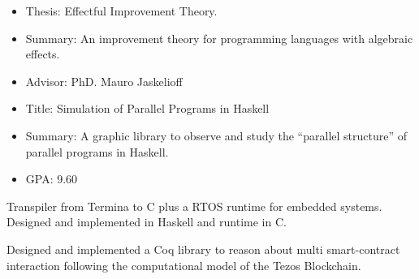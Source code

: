 

\newpage

    \begin{itemize}
        \item Thesis: Effectful Improvement Theory.
        \item Summary: An improvement theory for programming languages with
                algebraic effects.
        \item Advisor: PhD. Mauro Jaskelioff
    \end{itemize}
    \divider

    \begin{itemize}
        \item Title: Simulation of Parallel Programs in Haskell
        \item Summary: A graphic library to observe and study the ``parallel
                structure'' of parallel programs in Haskell.
        \item GPA: 9.60
    \end{itemize}

    Transpiler from Termina to C plus a RTOS runtime for embedded systems.
    Designed and implemented in Haskell and runtime in C.

    \divider

    Designed and implemented a Coq library to reason about multi smart-contract
interaction following the computational model of the Tezos Blockchain.

